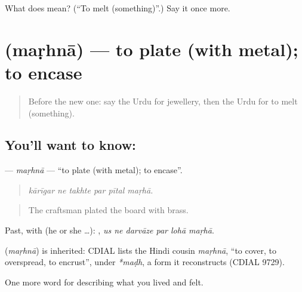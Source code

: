 \begin{tcolorbox}[breakable,colback=teal!4,colframe=teal!35!black,title={Before you move on}]
What does  mean? (\textquotedblleft{}To melt (something)\textquotedblright{}.) Say it once more.
\end{tcolorbox}
\section[\texorpdfstring{\ur{مڑھنا} (maṛhnā)}{مڑھنا (maṛhnā)}]{ (maṛhnā) — to plate (with metal); to encase}

\label{lesson:UR-C501-marhna}



\begin{quote}
Before the new one: say the Urdu for jewellery, then the Urdu for to melt (something).
\end{quote}

\subsection*{You'll want to know: }
\textbf{} — \emph{maṛhnā} — \textquotedblleft{}to plate (with metal); to encase\textquotedblright{}.

\begin{quote}
     
\end{quote}

\begin{quote}
\emph{kārīgar ne takhte par pītal maṛhā.}
\end{quote}

\begin{quote}
The craftsman plated the board with brass.
\end{quote}

Past, with  (he or she …):      , \emph{us ne darvāze par lohā maṛhā}.

\begin{cousinweb}
\textbf{} (\emph{maṛhnā}) is inherited: CDIAL lists the Hindi cousin \emph{maṛhnā}, \textquotedblleft{}to cover, to overspread, to encrust\textquotedblright{}, under \emph{*maḍh}, a form it reconstructs (CDIAL 9729).
\end{cousinweb}

\begin{grammarlens}[title={What you've built}]
One more word for describing what you lived and felt.
\end{grammarlens}

